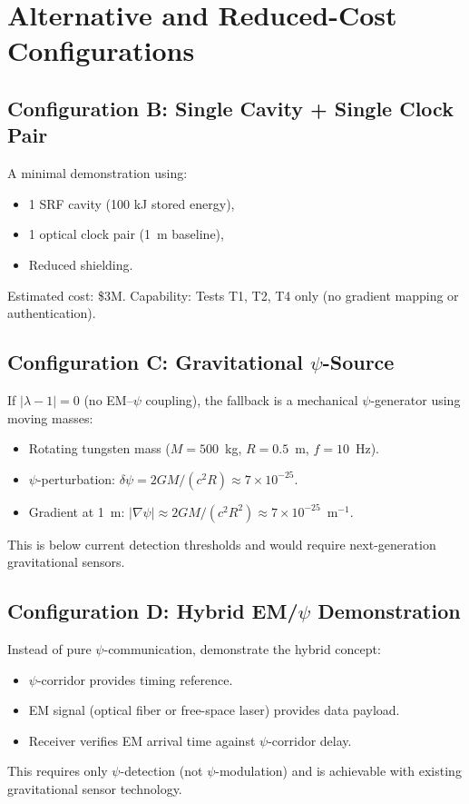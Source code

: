 \documentclass[11pt,onecolumn]{article}
\begin{document}
\section{Alternative and Reduced-Cost Configurations}

\subsection{Configuration B: Single Cavity + Single Clock Pair}

A minimal demonstration using:
\begin{itemize}
\item 1 SRF cavity (100 kJ stored energy),
\item 1 optical clock pair (1~m baseline),
\item Reduced shielding.
\end{itemize}

Estimated cost: \$3M.
Capability: Tests T1, T2, T4 only (no gradient mapping or authentication).

\subsection{Configuration C: Gravitational $\psi$-Source}

If $|\lambda - 1| = 0$ (no EM--$\psi$ coupling), the fallback is
a mechanical $\psi$-generator using moving masses:
\begin{itemize}
\item Rotating tungsten mass ($M = 500$~kg, $R = 0.5$~m, $f = 10$~Hz).
\item $\psi$-perturbation:
$\delta\psi = 2GM/(c^2 R) \approx 7 \times 10^{-25}$.
\item Gradient at 1~m:
$|\nabla\psi| \approx 2GM/(c^2 R^2) \approx 7 \times 10^{-25}$~m$^{-1}$.
\end{itemize}
This is below current detection thresholds and would require
next-generation gravitational sensors.

\subsection{Configuration D: Hybrid EM/$\psi$ Demonstration}

Instead of pure $\psi$-communication, demonstrate the hybrid concept:
\begin{itemize}
\item $\psi$-corridor provides timing reference.
\item EM signal (optical fiber or free-space laser) provides data payload.
\item Receiver verifies EM arrival time against $\psi$-corridor delay.
\end{itemize}
This requires only $\psi$-detection (not $\psi$-modulation) and is
achievable with existing gravitational sensor technology.
\end{document}

